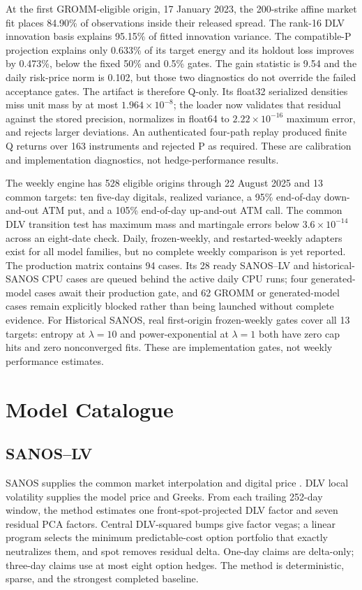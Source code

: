 \documentclass[10pt]{article}
\begin{document}
At the first GROMM-eligible origin, 17 January 2023, the 200-strike affine
market fit places 84.90\% of observations inside their released spread. The
rank-16 DLV innovation basis explains 95.15\% of fitted innovation variance.
The compatible-P projection explains only 0.633\% of its target energy and its
holdout loss improves by 0.473\%, below the fixed 50\% and 0.5\% gates. The
gain statistic is 9.54 and the daily risk-price norm is 0.102, but those two
diagnostics do not override the failed acceptance gates. The artifact is
therefore Q-only. Its float32 serialized densities miss unit mass by at most
$1.964\times10^{-8}$; the loader now validates that residual against the stored
precision, normalizes in float64 to $2.22\times10^{-16}$ maximum error, and
rejects larger deviations. An authenticated four-path replay produced finite Q
returns over 163 instruments and rejected P as required. These are calibration
and implementation diagnostics, not hedge-performance results.

The weekly engine has 528 eligible origins through 22 August 2025 and 13 common
targets: ten five-day digitals, realized variance, a 95\% end-of-day down-and-out
ATM put, and a 105\% end-of-day up-and-out ATM call. The common DLV transition
test has maximum mass and martingale errors below $3.6\times10^{-14}$ across an
eight-date check. Daily, frozen-weekly, and restarted-weekly adapters exist for
all model families, but no complete weekly comparison is yet reported. The
production matrix contains 94 cases. Its 28 ready SANOS--LV and historical-SANOS
CPU cases are queued behind the active daily CPU runs; four generated-model
cases await their production gate, and 62 GROMM or generated-model cases remain
explicitly blocked rather than being launched without complete evidence.
For Historical SANOS, real first-origin frozen-weekly gates cover all 13 targets:
entropy at $\lambda=10$ and power-exponential at $\lambda=1$ both have zero cap
hits and zero nonconverged fits. These are implementation gates, not weekly
performance estimates.

\section{Model Catalogue}

\subsection{SANOS--LV}

SANOS supplies the common market interpolation and digital price
\citep{SANOS2026}. DLV local
volatility supplies the model price and Greeks. From each trailing 252-day
window, the method estimates one front-spot-projected DLV factor and seven
residual PCA factors. Central DLV-squared bumps give factor vegas; a linear
program selects the minimum predictable-cost option portfolio that exactly
neutralizes them, and spot removes residual delta. One-day claims are
delta-only; three-day claims use at most eight option hedges. The method is
deterministic, sparse, and the strongest completed baseline.
\end{document}
